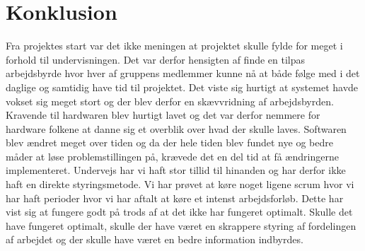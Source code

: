 \chapter{Konklusion}
Fra projektes start var det ikke meningen at projektet skulle fylde for meget i forhold til undervisningen. Det var derfor hensigten af finde en tilpas arbejdsbyrde hvor hver af gruppens medlemmer kunne nå at både følge med i det daglige og samtidig have tid til projektet. Det viste sig hurtigt at systemet havde vokset sig meget stort og der blev derfor en skævvridning af arbejdsbyrden. Kravende til hardwaren blev hurtigt lavet og det var derfor nemmere for hardware folkene at danne sig et overblik over hvad der skulle laves. Softwaren blev ændret meget over tiden og da der hele tiden blev fundet nye og bedre måder at løse problemstillingen på, krævede det en del tid at få ændringerne implementeret. Undervejs har vi haft stor tillid til hinanden og har derfor ikke haft en direkte styringsmetode. Vi har prøvet at køre noget ligene scrum hvor vi har haft perioder hvor vi har aftalt at køre et intenst arbejdsforløb. Dette har vist sig at fungere godt på trods af at det ikke har fungeret optimalt. Skulle det have fungeret optimalt, skulle der have været en skrappere styring af fordelingen af arbejdet og der skulle have været en bedre information indbyrdes.   